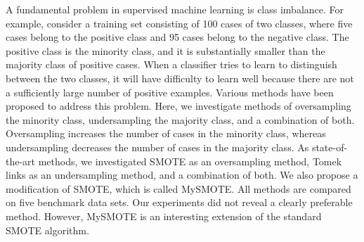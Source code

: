 A fundamental problem in supervised machine learning is class imbalance. For example, consider a training set consisting of 100 cases of two classes, where five cases belong to the positive class and 95 cases belong to the negative class. The positive class is the minority class, and it is substantially smaller than the majority class of positive cases. When a classifier tries to learn to distinguish between the two classes, it will have difficulty to learn well because there are not a sufficiently large number of positive examples. Various methods have been proposed to address this problem. Here, we investigate methods of oversampling the minority class, undersampling the majority class, and a combination of both. Oversampling increases the number of cases in the minority class, whereas undersampling decreases the number of cases in the majority class. As state-of-the-art methods, we investigated SMOTE as an oversampling method, Tomek links as an undersampling method, and a combination of both. We also propose a modification of SMOTE, which is called MySMOTE. All methods are compared on five benchmark data sets. Our experiments did not reveal a clearly preferable method. However, MySMOTE is an interesting extension of the standard SMOTE algorithm.  